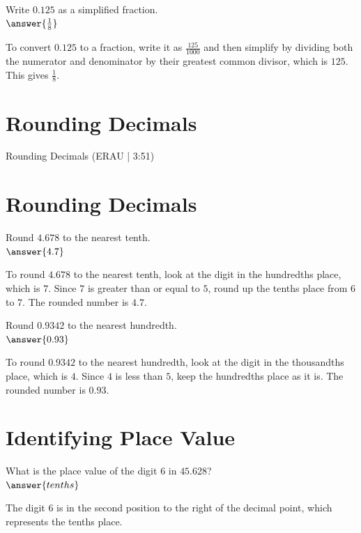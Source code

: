 \documentclass{ximera}
\begin{document}
\begin{problem}
Write $0.125$ as a simplified fraction.\\
$\answer{\frac{1}{8}}$
\begin{feedback}
To convert $0.125$ to a fraction, write it as $\frac{125}{1000}$ and then simplify by dividing both the numerator and denominator by their greatest common divisor, which is $125$. This gives $\frac{1}{8}$.
\end{feedback}
\end{problem}


\section*{Rounding Decimals}

Rounding Decimals (ERAU | 3:51)


\section*{Rounding Decimals}

\begin{problem}
Round $4.678$ to the nearest tenth.\\
$\answer{4.7}$
\begin{feedback}
To round $4.678$ to the nearest tenth, look at the digit in the hundredths place, which is $7$. Since $7$ is greater than or equal to $5$, round up the tenths place from $6$ to $7$. The rounded number is $4.7$.
\end{feedback}
\end{problem}

\begin{problem}
Round $0.9342$ to the nearest hundredth.\\
$\answer{0.93}$
\begin{feedback}
To round $0.9342$ to the nearest hundredth, look at the digit in the thousandths place, which is $4$. Since $4$ is less than $5$, keep the hundredths place as it is. The rounded number is $0.93$.
\end{feedback}
\end{problem}

\section*{Identifying Place Value}

\begin{problem}
What is the place value of the digit $6$ in $45.628$?\\
$\answer{tenths}$
\begin{feedback}
The digit $6$ is in the second position to the right of the decimal point, which represents the tenths place.
\end{feedback}
\end{problem}
\end{document}
